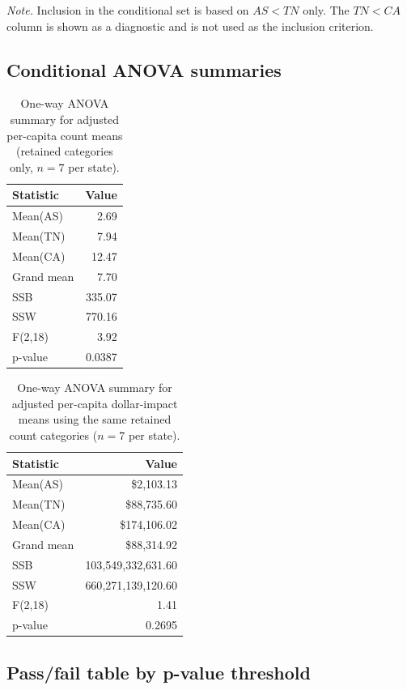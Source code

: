\noindent\textit{Note.} Inclusion in the conditional set is based on $AS<TN$ only. The $TN<CA$ column is shown as a diagnostic and is not used as the inclusion criterion.
\subsection{Conditional ANOVA summaries}

\begin{table}[H]
  \centering
  \caption{One-way ANOVA summary for adjusted per-capita count means (retained categories only, $n=7$ per state).}
  \label{tab:conditional-count-summary}
  \begin{tabular}{@{}lr@{}}
    \toprule
    Statistic & Value\\
    \midrule
    Mean(AS) & 2.69\\
    Mean(TN) & 7.94\\
    Mean(CA) & 12.47\\
    Grand mean & 7.70\\
    SSB & 335.07\\
    SSW & 770.16\\
    F(2,18) & 3.92\\
    p-value & 0.0387\\
    \bottomrule
  \end{tabular}
\end{table}

\begin{table}[H]
  \centering
  \caption{One-way ANOVA summary for adjusted per-capita dollar-impact means using the same retained count categories ($n=7$ per state).}
  \label{tab:conditional-impact-summary}
  \begin{tabular}{@{}lr@{}}
    \toprule
    Statistic & Value\\
    \midrule
    Mean(AS) & \$2{,}103.13\\
    Mean(TN) & \$88{,}735.60\\
    Mean(CA) & \$174{,}106.02\\
    Grand mean & \$88{,}314.92\\
    SSB & 103{,}549{,}332{,}631.60\\
    SSW & 660{,}271{,}139{,}120.60\\
    F(2,18) & 1.41\\
    p-value & 0.2695\\
    \bottomrule
  \end{tabular}
\end{table}

\subsection{Pass/fail table by p-value threshold}

